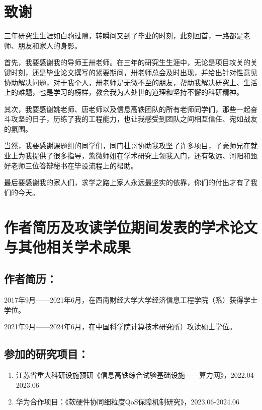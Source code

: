 \chapter[致谢]{致\quad 谢}%

三年研究生生涯如白驹过隙，转瞬间又到了毕业的时刻，此刻回首，一路都是老师、朋友和家人的身影。

首先，我要感谢我的导师王卅老师。在三年的研究生生涯中，无论是项目攻关的关键时刻，还是毕业论文撰写的紧要期间，卅老师总会及时出现，并给出针对性意见协助解决问题，对于我个人，卅老师是无微不至的朋友，帮助我解决研究上、生活上的难题，也是学习的榜样，教会我为人处世的道理和坚持不懈的科研精神。

其次，我要感谢姚老师、唐老师以及信息高铁团队的所有老师同学们，那些一起奋斗攻坚的日子，历练了我的工程能力，也让我感受到团队之间相互信任、宛如战友的氛围。

当然，我要感谢课题组的同学们，同门杜哥协助我攻坚了许多项目，子豪师兄在就业上为我提供了很多指导，紫微师姐在学术研究上领我入门，还有敬远、河阳和甄好老师三位答辩秘书在毕设流程上的帮助。

最后要感谢我的家人们，求学之路上家人永远最坚实的依靠，你们的付出才有了我们的今天。


\chapter{作者简历及攻读学位期间发表的学术论文与其他相关学术成果}

\section*{作者简历：}

2017年9月——2021年6月，在西南财经大学大学经济信息工程学院（系）获得学士学位。

2021年9月——2024年6月，在中国科学院计算技术研究所）攻读硕士学位。

\section*{参加的研究项目：}

\begin{enumerate}
    \item 江苏省重大科研设施预研《信息高铁综合试验基础设施——算力网》，2022.04-2023.06
    \item 华为合作项目：《软硬件协同细粒度QoS保障机制研究》，2023.06-2024.06
\end{enumerate}


\cleardoublepage[plain]%
